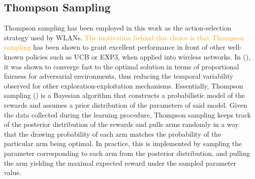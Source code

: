 \documentclass[preprint,12pt]{elsarticle}
\begin{document}
\subsection{Thompson Sampling}
\label{subsection:thompson_sampling}
Thompson sampling has been employed in this work as the action-selection strategy used by WLANs. \textcolor{orange}{The motivation behind this choice is that Thompson sampling} has been shown to grant excellent performance in front of other well-known policies such as UCB or EXP3, when applied into wireless networks. In (\citealp{wilhelmi2017collaborative}), it was shown to converge fast to the optimal solution in terms of proportional fairness for adversarial environments, thus reducing the temporal variability observed for other exploration-exploitation mechanisms. Essentially, Thompson sampling (\citealp{thompson1933likelihood}) is a Bayesian algorithm that constructs a probabilistic model of the rewards and assumes a prior distribution of the parameters of said model. Given the data collected during the learning procedure, Thompson sampling keeps track of the posterior distribution of the rewards and pulls arms randomly in a way that the drawing probability of each arm matches the probability of the particular arm being optimal. In practice, this is implemented by sampling the parameter corresponding to each arm from the posterior distribution, and pulling the arm yielding the maximal expected reward under the sampled parameter value. 
\end{document}
